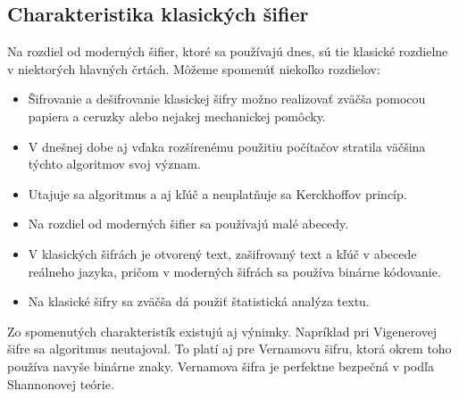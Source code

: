 \subsection{Charakteristika klasických šifier}
Na rozdiel od moderných šifier, ktoré sa používajú dnes, sú tie klasické rozdielne v niektorých hlavných črtách.
Môžeme spomenúť niekoľko rozdielov:
\begin{itemize}
\item Šifrovanie a dešifrovanie klasickej šifry možno realizovať zväčša pomocou papiera a ceruzky alebo nejakej mechanickej pomôcky.
\item V dnešnej dobe aj vďaka rozšírenému použitiu počítačov stratila väčšina týchto algoritmov svoj význam.
\item Utajuje sa algoritmus a aj kľúč a neuplatňuje sa Kerckhoffov princíp.
\item Na rozdiel od moderných šifier sa používajú malé abecedy.
\item V klasických šifrách je otvorený text, zašifrovaný text a kľúč v abecede reálneho jazyka, pričom v moderných šifrách sa používa binárne kódovanie.
\item Na klasické šifry sa zväčša dá použiť štatistická analýza textu. 
\end{itemize}
Zo spomenutých charakteristík existujú aj výnimky. Napríklad pri Vigenerovej šifre sa algoritmus neutajoval. To platí aj pre Vernamovu šifru, ktorá okrem toho používa navyše binárne znaky. Vernamova šifra je perfektne bezpečná v podľa Shannonovej teórie.

